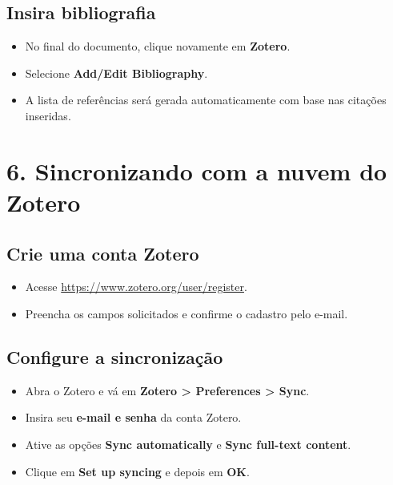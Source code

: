 \documentclass[
  letterpaper,
  DIV=11,
  numbers=noendperiod]{scrreprt}
\providecommand{\tightlist}{%
  \setlength{\itemsep}{0pt}\setlength{\parskip}{0pt}}
\begin{document}
\subsection{Insira bibliografia}\label{insira-bibliografia}

\begin{itemize}
\tightlist
\item
  No final do documento, clique novamente em \textbf{Zotero}.
\item
  Selecione \textbf{Add/Edit Bibliography}.
\item
  A lista de referências será gerada automaticamente com base nas
  citações inseridas.
\end{itemize}

\section{6. Sincronizando com a nuvem do
Zotero}\label{sincronizando-com-a-nuvem-do-zotero}

\subsection{Crie uma conta Zotero}\label{crie-uma-conta-zotero}

\begin{itemize}
\tightlist
\item
  Acesse \url{https://www.zotero.org/user/register}.
\item
  Preencha os campos solicitados e confirme o cadastro pelo e-mail.
\end{itemize}

\subsection{Configure a
sincronização}\label{configure-a-sincronizauxe7uxe3o}

\begin{itemize}
\tightlist
\item
  Abra o Zotero e vá em \textbf{Zotero \textgreater{} Preferences
  \textgreater{} Sync}.
\item
  Insira seu \textbf{e-mail e senha} da conta Zotero.
\item
  Ative as opções \textbf{Sync automatically} e \textbf{Sync full-text
  content}.
\item
  Clique em \textbf{Set up syncing} e depois em \textbf{OK}.
\end{itemize}
\end{document}
